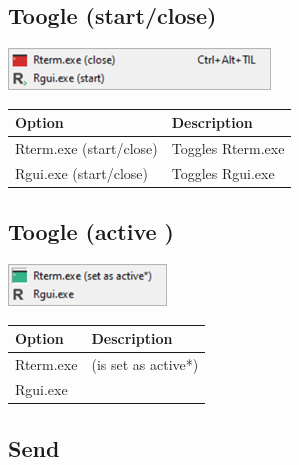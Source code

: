 \hypertarget{menu_r_toogle_start}{}
\subsection{Toogle (start/close)}

\includegraphics[scale=0.8]{./res/menu_r_toogle_start.png}\\

\begin{scriptsize}
  \begin{tabularx}{\textwidth}{>{\hsize=0.7\hsize}X>{\hsize=0.7\hsize}X}\\
    \hline
    \textbf{Option} & \textbf{Description} \\
    \hline
    Rterm.exe (start/close) & Toggles Rterm.exe \\
    Rgui.exe (start/close) & Toggles Rgui.exe \\
    \hline
  \end{tabularx}
\end{scriptsize}

\hypertarget{menu_r_toogle_active}{}
\subsection{Toogle (active \RR{})}

\includegraphics[scale=0.8]{./res/menu_r_toogle_active.png}\\

\begin{scriptsize}
  \begin{tabularx}{\textwidth}{>{\hsize=0.7\hsize}X>{\hsize=0.7\hsize}X}\\
    \hline
    \textbf{Option} & \textbf{Description} \\
    \hline
    Rterm.exe & (is set as active*) \\
    Rgui.exe \\
    \hline
  \end{tabularx}
\end{scriptsize}

\hypertarget{menu_r_send}{}
\subsection{Send}

